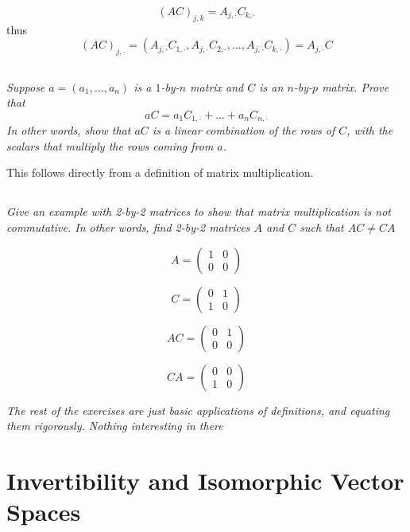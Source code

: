 \documentclass[11pt,oneside,titlepage]{book}
\begin{document}
$$(AC)_{j, k} = A_{j, \cdot} C_{k, \cdot}$$
thus
$$(AC)_{j, \cdot} = (A_{j, \cdot} C_{1, \cdot}, A_{j, \cdot} C_{2, \cdot}, ..., A_{j, \cdot} C_{k, \cdot}) =
A_{j, \cdot} C
$$

\subsection{}

\textit{Suppose $a = (a_1, ..., a_n)$ is a $1$-by-$n$ matrix and $C$ is an $n$-by-$p$ matrix.
  Prove that }
$$aC = a_1 C_{1, \cdot} + ... + a_n C_{n, \cdot}$$
\textit{In other words, show that $aC$ is a linear combination of the rows of $C$,
  with the scalars that multiply the rows coming from $a$.}

This follows directly from a definition of matrix multiplication.

\subsection{}

\textit{Give an example with 2-by-2 matrices to show that matrix multiplication is not
  commutative. In other words, find 2-by-2 matrices $A$ and $C$ such that
  $AC \neq CA$}

$$A =
\begin{pmatrix}
  1 & 0 \\
  0 & 0
\end{pmatrix}
$$

$$C =
\begin{pmatrix}
  0 & 1 \\
  1 & 0
\end{pmatrix}
$$

$$AC =
\begin{pmatrix}
  0 & 1 \\
  0 & 0
\end{pmatrix}
$$

$$CA =
\begin{pmatrix}
  0 & 0 \\
  1 & 0
\end{pmatrix}
$$

\textit{The rest of the exercises are just basic applications of definitions, and equating them
  rigorously. Nothing interesting in there}

\section{Invertibility and Isomorphic Vector Spaces}
\end{document}
